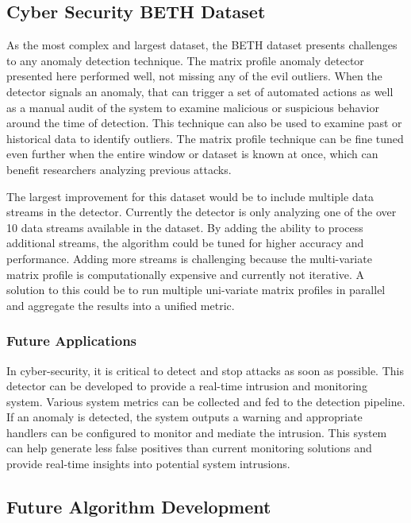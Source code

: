 \subsection{Cyber Security BETH Dataset}

As the most complex and largest dataset, the BETH dataset presents challenges to any anomaly detection technique. The matrix profile anomaly detector presented here performed well, not missing any of the evil outliers. When the detector signals an anomaly, that can trigger a set of automated actions as well as a manual audit of the system to examine malicious or suspicious behavior around the time of detection. This technique can also be used to examine past or historical data to identify outliers. The matrix profile technique can be fine tuned even further when the entire window or dataset is known at once, which can benefit researchers analyzing previous attacks. 

The largest improvement for this dataset would be to include multiple data streams in the detector. Currently the detector is only analyzing one of the over 10 data streams available in the dataset. By adding the ability to process additional streams, the algorithm could be tuned for higher accuracy and performance. Adding more streams is challenging because the multi-variate matrix profile is computationally expensive and currently not iterative. A solution to this could be to run multiple uni-variate matrix profiles in parallel and aggregate the results into a unified metric. 

\subsubsection{Future Applications}

In cyber-security, it is critical to detect and stop attacks as soon as possible. This detector can be developed to provide a real-time intrusion and monitoring system. Various system metrics can be collected and fed to the detection pipeline. If an anomaly is detected, the system outputs a warning and appropriate handlers can be configured to monitor and mediate the intrusion. This system can help generate less false positives than current monitoring solutions and provide real-time insights into potential system intrusions. 

\subsection{Future Algorithm Development}


